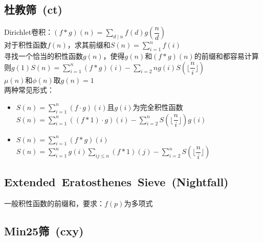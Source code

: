     \subsection*{杜教筛~\small(ct)}
        \noindent Dirichlet卷积：$ (f \ast g) (n) = \sum\limits_{d \mid n}^{} f(d) g(\dfrac{n}{d}) $
        \\对于积性函数$ f(n) $，求其前缀和$ S(n) = \sum\limits_{i = 1}^{n} f(i) $
        \\寻找一个恰当的积性函数$ g(n) $，使得$ g(n) $和$ (f \ast g) (n) $的前缀和都容易计算
        \\则$ g(1) S(n) = \sum\limits_{i = 1}^{n} (f \ast g) (i) - \sum\limits_{i = 2}{n} g(i) S(\lfloor \dfrac{n}{i} \rfloor) $
        \\$ \mu (n) $和$ \phi (n) $取$ g(n) = 1 $
        \\两种常见形式：
        \begin{itemize}[wide=0pt]
            \item $ S(n) = \sum\limits_{i = 1}^{n} (f \cdot g) (i) $且$ g(i) $为完全积性函数
                \\$ S(n) = \sum\limits_{i = 1}^{n} ((f \ast 1) \cdot g) (i) - \sum\limits_{i = 2}^{n} S(\lfloor \dfrac{n}{i} \rfloor) g(i) $
            \item $ S(n) = \sum\limits_{i = 1}^{n} (f \ast g) (i) $
                \\$ S(n) = \sum\limits_{i = 1}^{n} g (i) \sum\limits_{ij \leq n}^{} (f \ast 1) (j) - \sum\limits_{i = 2}^{n} S(\lfloor \dfrac{n}{i} \rfloor) $
        \end{itemize}

    \subsection*{Extended~Eratosthenes~Sieve~\small(Nightfall)}
        一般积性函数的前缀和，要求：$ f(p) $为多项式

    \subsection*{Min25筛~\small(cxy)}
